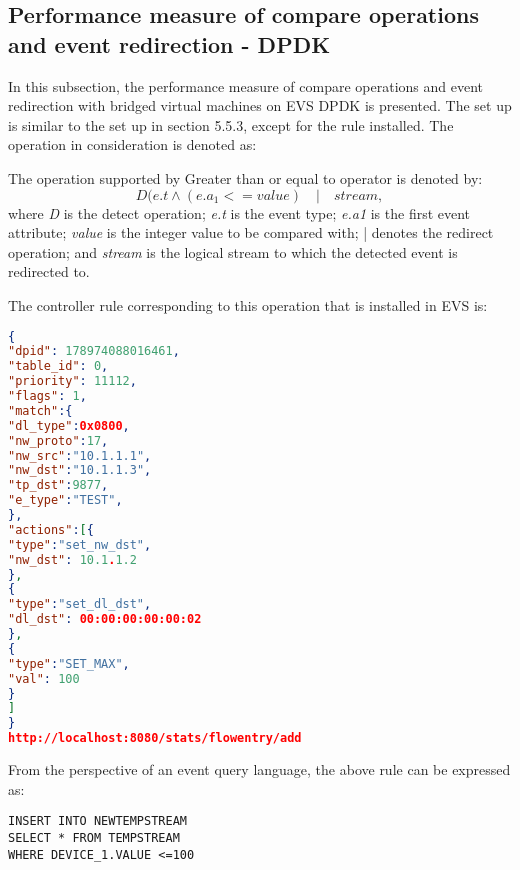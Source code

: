 \subsection{Performance measure of compare operations and event redirection - DPDK}
In this subsection, the performance measure of compare operations and event redirection with bridged virtual machines on EVS DPDK is presented. The set up is similar to the set up in section 5.5.3, except for the rule installed. The operation in consideration is denoted as:

The operation supported by Greater than or equal to operator is denoted by:
\begin{equation}D(e.t  \wedge (e.a_1 <= value) \quad | \quad stream, \end{equation}
where \textit{D} is the detect operation; \newline
\textit{e.t} is the event type; \newline
\textit{e.a1} is the first event attribute; \newline
\textit{value} is the integer value to be compared with; \newline
| denotes the redirect operation; \newline
and \textit{stream} is the logical stream to which the detected event is redirected to. \newline \newline

The controller rule corresponding to this operation that is installed in EVS  is:

\begin{lstlisting}[language=json,firstnumber=1]
{
"dpid": 178974088016461,
"table_id": 0,
"priority": 11112,
"flags": 1,
"match":{
"dl_type":0x0800,
"nw_proto":17,
"nw_src":"10.1.1.1",
"nw_dst":"10.1.1.3",
"tp_dst":9877,
"e_type":"TEST",
},
"actions":[{
"type":"set_nw_dst",
"nw_dst": 10.1.1.2
},
{
"type":"set_dl_dst",
"dl_dst": 00:00:00:00:00:02
},
{
"type":"SET_MAX",
"val": 100
}
]
}
http://localhost:8080/stats/flowentry/add \end{lstlisting}

From the perspective of an event query language, the above rule can be expressed as:

\begin{verbatim}
INSERT INTO NEWTEMPSTREAM
SELECT * FROM TEMPSTREAM 
WHERE DEVICE_1.VALUE <=100
\end{verbatim}

